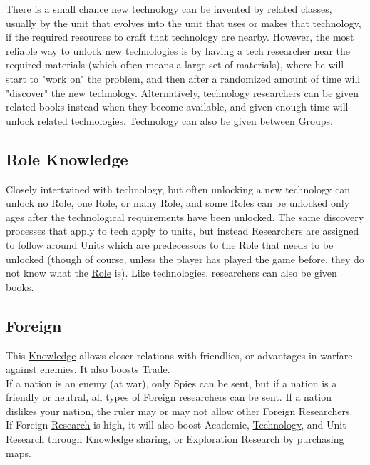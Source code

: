\documentclass[11pt]{article}
\begin{document}
There is a small chance new technology can be invented by related classes, usually by the unit that evolves into the unit that uses or makes that technology, if the required resources to craft that technology are nearby. However, the most reliable way to unlock new technologies is by having a tech researcher near the required materials (which often means a large set of materials), where he will start to "work on" the problem, and then after a randomized amount of time will "discover" the new technology. Alternatively, technology researchers can be given related books instead when they become available, and given enough time will unlock related technologies. \hyperref[org85e435a]{Technology} can also be given between \hyperref[org21e4d88]{Groups}.\\
\subsection{Role Knowledge}
\label{sec:org2237366}
Closely intertwined with technology, but often unlocking a new technology can unlock no \hyperref[orgada42dd]{Role}, one \hyperref[orgada42dd]{Role}, or many \hyperref[orgada42dd]{Role}, and some \hyperref[org080bb13]{Roles} can be unlocked only ages after the technological requirements have been unlocked. The same discovery processes that apply to tech apply to units, but instead Researchers are assigned to follow around Units which are predecessors to the \hyperref[orgada42dd]{Role} that needs to be unlocked (though of course, unless the player has played the game before, they do not know what the \hyperref[orgada42dd]{Role} is). Like technologies, researchers can also be given books.\\
\subsection{Foreign}
\label{sec:org220772e}
This \hyperref[orgd7203c2]{Knowledge} allows closer relations with friendlies, or advantages in warfare against enemies. It also boosts \hyperref[orgdbeaa2d]{Trade}.\\

If a nation is an enemy (at war), only Spies can be sent, but if a nation is a friendly or neutral, all types of Foreign researchers can be sent. If a nation dislikes your nation, the ruler may or may not allow other Foreign Researchers.\\

If Foreign \hyperref[orga5818bf]{Research} is high, it will also boost Academic, \hyperref[org85e435a]{Technology}, and Unit \hyperref[orga5818bf]{Research} through \hyperref[orgd7203c2]{Knowledge} sharing, or Exploration \hyperref[orga5818bf]{Research} by purchasing maps.\\
\end{document}
